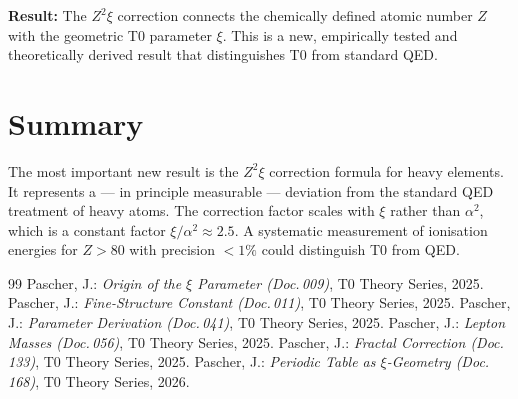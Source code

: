 \textbf{Result:} The $Z^2\xi$ correction connects the chemically defined
atomic number $Z$ with the geometric T0 parameter $\xi$. This is a new,
empirically tested and theoretically derived result that distinguishes
T0 from standard QED.

\section{Summary}
\label{sec:169-summary}

\begin{table}[htbp]
\centering
\caption{Status of the three follow-up investigations}
\label{tab:status}
\end{table}

The most important new result is the $Z^2\xi$ correction formula for heavy
elements. It represents a — in principle measurable — deviation from the
standard QED treatment of heavy atoms. The correction factor scales with $\xi$
rather than $\alpha^2$, which is a constant factor $\xi/\alpha^2 \approx 2.5$.
A systematic measurement of ionisation energies for $Z > 80$ with precision
$<1\%$ could distinguish T0 from QED.

\begin{thebibliography}{99}
 Pascher, J.: \emph{Origin of the $\xi$ Parameter (Doc.\,009)},
  T0 Theory Series, 2025.
 Pascher, J.: \emph{Fine-Structure Constant (Doc.\,011)},
  T0 Theory Series, 2025.
 Pascher, J.: \emph{Parameter Derivation (Doc.\,041)},
  T0 Theory Series, 2025.
 Pascher, J.: \emph{Lepton Masses (Doc.\,056)},
  T0 Theory Series, 2025.
 Pascher, J.: \emph{Fractal Correction (Doc.\,133)},
  T0 Theory Series, 2025.
 Pascher, J.: \emph{Periodic Table as $\xi$-Geometry (Doc.\,168)},
  T0 Theory Series, 2026.
\end{thebibliography}
